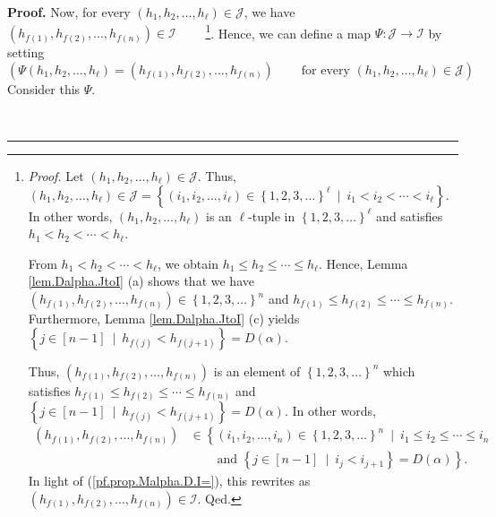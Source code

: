\documentclass[numbers=enddot,12pt,final,onecolumn,notitlepage,abstracton]{scrartcl}
\theoremstyle{definition}
\newenvironment{proof}[1][Proof]{\noindent\textbf{#1.} }{\ \rule{0.5em}{0.5em}}
\newenvironment{verlong}{}{}
\begin{document}
\begin{verlong}
\begin{footnotesize}
\begin{proof}
Now, for every $\left(  h_{1},h_{2},\ldots,h_{\ell}\right)  \in\mathcal{J}$,
we have $\left(  h_{f\left(  1\right)  },h_{f\left(  2\right)  }%
,\ldots,h_{f\left(  n\right)  }\right)  \in\mathcal{I}$%
\ \ \ \ \footnote{\textit{Proof.} Let $\left(  h_{1},h_{2},\ldots,h_{\ell
}\right)  \in\mathcal{J}$. Thus, $\left(  h_{1},h_{2},\ldots,h_{\ell}\right)
\in\mathcal{J}=\left\{  \left(  i_{1},i_{2},\ldots,i_{\ell}\right)
\in\left\{  1,2,3,\ldots\right\}  ^{\ell}\ \mid\ i_{1}<i_{2}<\cdots<i_{\ell
}\right\}  $. In other words, $\left(  h_{1},h_{2},\ldots,h_{\ell}\right)  $
is an $\ell$-tuple in $\left\{  1,2,3,\ldots\right\}  ^{\ell}$ and satisfies
$h_{1}<h_{2}<\cdots<h_{\ell}$.
\par
From $h_{1}<h_{2}<\cdots<h_{\ell}$, we obtain $h_{1}\leq h_{2}\leq\cdots\leq
h_{\ell}$. Hence, Lemma \ref{lem.Dalpha.JtoI} (a) shows that we have $\left(
h_{f\left(  1\right)  },h_{f\left(  2\right)  },\ldots,h_{f\left(  n\right)
}\right)  \in\left\{  1,2,3,\ldots\right\}  ^{n}$ and $h_{f\left(  1\right)
}\leq h_{f\left(  2\right)  }\leq\cdots\leq h_{f\left(  n\right)  }$.
Furthermore, Lemma \ref{lem.Dalpha.JtoI} (c) yields $\left\{  j\in\left[
n-1\right]  \ \mid\ h_{f\left(  j\right)  }<h_{f\left(  j+1\right)  }\right\}
=D\left(  \alpha\right)  $.
\par
Thus, $\left(  h_{f\left(  1\right)  },h_{f\left(  2\right)  },\ldots
,h_{f\left(  n\right)  }\right)  $ is an element of $\left\{  1,2,3,\ldots
\right\}  ^{n}$ which satisfies $h_{f\left(  1\right)  }\leq h_{f\left(
2\right)  }\leq\cdots\leq h_{f\left(  n\right)  }$ and $\left\{  j\in\left[
n-1\right]  \ \mid\ h_{f\left(  j\right)  }<h_{f\left(  j+1\right)  }\right\}
=D\left(  \alpha\right)  $. In other words,%
\begin{align*}
\left(  h_{f\left(  1\right)  },h_{f\left(  2\right)  },\ldots,h_{f\left(
n\right)  }\right)   &  \in\left\{  \left(  i_{1},i_{2},\ldots,i_{n}\right)
\in\left\{  1,2,3,\ldots\right\}  ^{n}\ \mid\ i_{1}\leq i_{2}\leq\cdots\leq
i_{n}\right. \\
&  \ \ \ \ \ \ \ \ \ \ \left.  \text{and }\left\{  j\in\left[  n-1\right]
\ \mid\ i_{j}<i_{j+1}\right\}  =D\left(  \alpha\right)  \right\}  .
\end{align*}
In light of (\ref{pf.prop.Malpha.D.I=}), this rewrites as $\left(  h_{f\left(
1\right)  },h_{f\left(  2\right)  },\ldots,h_{f\left(  n\right)  }\right)
\in\mathcal{I}$. Qed.}. Hence, we can define a map $\Psi:\mathcal{J}%
\rightarrow\mathcal{I}$ by setting%
\[
\left(  \Psi\left(  h_{1},h_{2},\ldots,h_{\ell}\right)  =\left(  h_{f\left(
1\right)  },h_{f\left(  2\right)  },\ldots,h_{f\left(  n\right)  }\right)
\ \ \ \ \ \ \ \ \ \ \text{for every }\left(  h_{1},h_{2},\ldots,h_{\ell
}\right)  \in\mathcal{J}\right)  .
\]
Consider this $\Psi$.


\end{proof}
\end{footnotesize}
\end{verlong}
\end{document}
